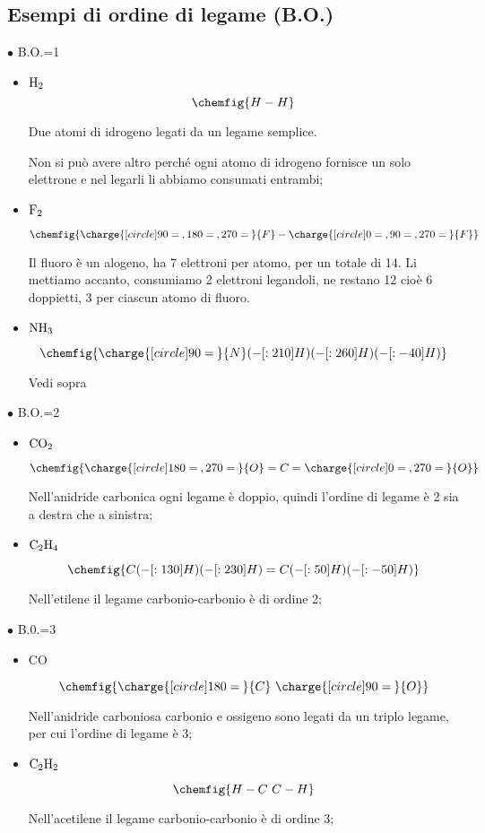 \subsection{Esempi di ordine di legame (B.O.)}
    $\bullet$ B.O.=1
    \begin{itemize}
        \item $\rm H_2$
        $$
        \chemfig{H-H}
        $$

        Due atomi di idrogeno legati da un legame semplice.
        
        Non si può avere altro perché ogni atomo di idrogeno fornisce un solo elettrone e nel legarli li abbiamo consumati entrambi;
        \item $\rm F_2$
        
        $$
        \chemfig{\charge{[circle]90=\:,180=\:,270=\:}{F}-\charge{[circle]0=\:,90=\:,270=\:}{F}}
        $$

        Il fluoro è un alogeno, ha 7 elettroni per atomo, per un totale di 14. Li mettiamo accanto, consumiamo 2 elettroni legandoli, ne restano 12 cioè 6 doppietti, 3 per ciascun atomo di fluoro.
        \item $\rm NH_3$
        
        $$
        \chemfig{\charge{[circle]90=\:}{N}(-[:210]H)(-[:260]H)(-[:-40]H)}
        $$

        Vedi sopra
    \end{itemize}
    
    $\bullet$ B.O.=2
    \begin{itemize}
        \item $\rm CO_2$
        
        $$
        \chemfig{\charge{[circle]180=\:,270=\:}{O}=C=\charge{[circle]0=\:,270=\:}{O}}
        $$

        Nell'anidride carbonica ogni legame è doppio, quindi l'ordine di legame è 2 sia a destra che a sinistra;
        \item $\rm C_2H_4$
        
        $$
        \chemfig{C(-[:130]H)(-[:230]H)=C(-[:50]H)(-[:-50]H)}
        $$

        Nell'etilene il legame carbonio-carbonio è di ordine 2;
    \end{itemize}

    $\bullet$ B.0.=3
    \begin{itemize}
        \item CO
        
        $$
        \chemfig{\charge{[circle]180=\:}{C}~\charge{[circle]90=\:}{O}}
        $$

        Nell'anidride carboniosa carbonio e ossigeno sono legati da un triplo legame, per cui l'ordine di legame è 3;
        \item $\rm C_2H_2$
        
        $$
        \chemfig{H-C~C-H}
        $$

        Nell'acetilene il legame carbonio-carbonio è di ordine 3;
    \end{itemize}

